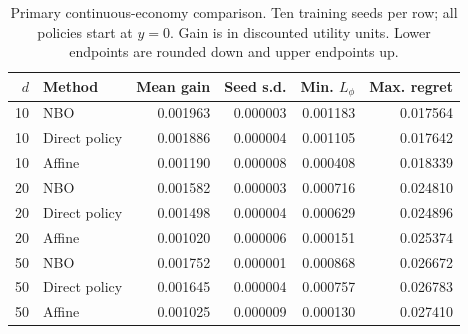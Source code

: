 \begin{table}[htbp]\centering\small\setlength{\tabcolsep}{4pt}
\caption{Primary continuous-economy comparison. Ten training seeds per row; all policies start at $y=0$. Gain is in discounted utility units. Lower endpoints are rounded down and upper endpoints up.}\label{tab:r11primary}
\begin{tabular}{rlrrrr}\toprule
$d$ & Method & Mean gain & Seed s.d. & Min. $L_\phi$ & Max. regret\\\midrule
10 & NBO & 0.001963 & 0.000003 & 0.001183 & 0.017564 \\
10 & Direct policy & 0.001886 & 0.000004 & 0.001105 & 0.017642 \\
10 & Affine & 0.001190 & 0.000008 & 0.000408 & 0.018339 \\
20 & NBO & 0.001582 & 0.000003 & 0.000716 & 0.024810 \\
20 & Direct policy & 0.001498 & 0.000004 & 0.000629 & 0.024896 \\
20 & Affine & 0.001020 & 0.000006 & 0.000151 & 0.025374 \\
50 & NBO & 0.001752 & 0.000001 & 0.000868 & 0.026672 \\
50 & Direct policy & 0.001645 & 0.000004 & 0.000757 & 0.026783 \\
50 & Affine & 0.001025 & 0.000009 & 0.000130 & 0.027410 \\
\bottomrule\end{tabular}\end{table}
